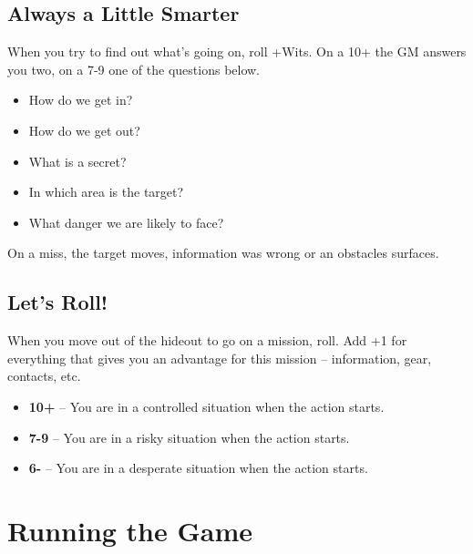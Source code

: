 \documentclass{book}
\begin{document}
\section*{Always a Little Smarter}
When you try to find out what's going on, roll +Wits. On a 10+ the GM answers you two, on a 7-9 one of the questions below.
\begin{itemize}
    \item How do we get in?
    \item How do we get out?
    \item What is a secret?
    \item In which area is the target?
    \item What danger we are likely to face?
\end{itemize}
On a miss, the target moves, information was wrong or an obstacles surfaces.

\section*{Let's Roll!}
When you move out of the hideout to go on a mission, roll. Add +1 for everything that gives you an advantage for this mission -- information, gear, contacts, etc.
\begin{itemize}
    \item \textbf{10+} -- You are in a controlled situation when the action starts.
    \item \textbf{7-9} -- You are in a risky situation when the action starts.
    \item \textbf{6-} -- You are in a desperate situation when the action starts.
\end{itemize}

\chapter*{Running the Game}
\end{document}
